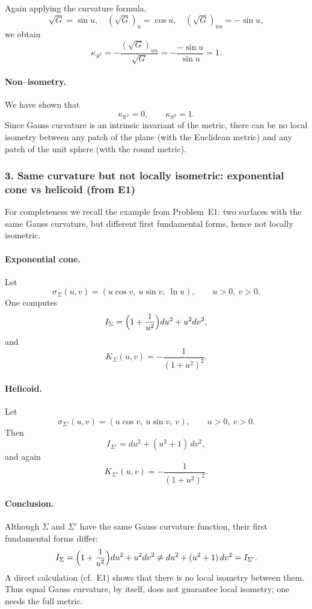 \documentclass[12pt,a4paper]{article}
\theoremstyle{plain}
\theoremstyle{definition}      %
\begin{document}
Again applying the curvature formula,
\[
\sqrt{G}=\sin u,\quad
(\sqrt{G})_{u} = \cos u,\quad
(\sqrt{G})_{uu} = -\sin u,
\]
we obtain
\[
\kappa_{S^{2}}
= -\frac{(\sqrt{G})_{uu}}{\sqrt{G}}
= -\frac{-\sin u}{\sin u} = 1.
\]

\paragraph{Non--isometry.}
We have shown that
\[
\kappa_{\mathbb{R}^{2}} = 0,\qquad
\kappa_{S^{2}} = 1.
\]
Since Gauss curvature is an intrinsic invariant of the metric, there can be
no local isometry between any patch of the plane (with the Euclidean metric)
and any patch of the unit sphere (with the round metric).

\medskip

\subsubsection*{3. Same curvature but not locally isometric:
	exponential cone vs helicoid (from E1)}

For completeness we recall the example from Problem~E1: two surfaces with the
same Gauss curvature, but different first fundamental forms, hence not
locally isometric.

\paragraph{Exponential cone.}
Let
\[
\sigma_{\Sigma}(u,v)
= (u\cos v,\ u\sin v,\ \ln u),\qquad u>0,\ v>0.
\]
One computes
\[
I_{\Sigma}
= \Bigl(1+\frac{1}{u^{2}}\Bigr)du^{2} + u^{2}dv^{2},
\]
and
\[
K_{\Sigma}(u,v)
= -\frac{1}{(1+u^{2})^{2}}.
\]

\paragraph{Helicoid.}
Let
\[
\sigma_{\Sigma'}(u,v)
= (u\cos v,\ u\sin v,\ v),\qquad u>0,\ v>0.
\]
Then
\[
I_{\Sigma'}
= du^{2} + (u^{2}+1)\,dv^{2},
\]
and again
\[
K_{\Sigma'}(u,v)
= -\frac{1}{(1+u^{2})^{2}}.
\]

\paragraph{Conclusion.}
Although $\Sigma$ and $\Sigma'$ have the same Gauss curvature function, their
first fundamental forms differ:
\[
I_{\Sigma}
= \Bigl(1+\frac{1}{u^{2}}\Bigr)du^{2} + u^{2}dv^{2}
\neq
du^{2} + (u^{2}+1)\,dv^{2}
= I_{\Sigma'}.
\]
A direct calculation (cf.\ E1) shows that there is no local isometry between
them.  Thus equal Gauss curvature, by itself, does not guarantee local
isometry; one needs the full metric.
\end{document}
